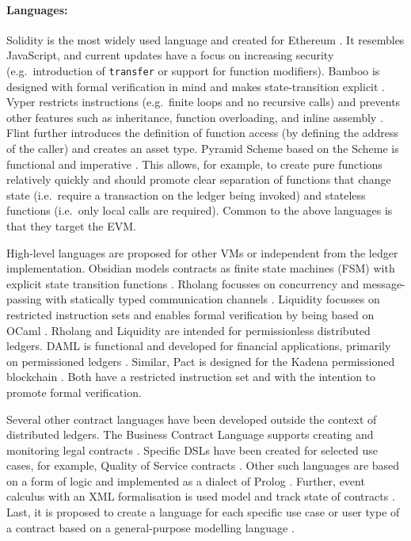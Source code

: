 \paragraph{Languages:}
Solidity is the most widely used language and created for Ethereum \cite{Ethereum2018Solidity}. It resembles JavaScript, and current updates have a focus on increasing security (e.g.\ introduction of \texttt{transfer} or support for function modifiers). 
Bamboo is designed with formal verification in mind and makes state-transition explicit \cite{Hirai2018Bamboo}. 
Vyper restricts instructions (e.g.\ finite loops and no recursive calls) and prevents other features such as inheritance, function overloading, and inline assembly \cite{Ethereum2018Vyper}. 
Flint further introduces the definition of function access (by defining the address of the caller) and creates an asset type. 
Pyramid Scheme based on the Scheme is functional and imperative \cite{Burge2018}. This allows, for example, to create pure functions relatively quickly and should promote clear separation of functions that change state (i.e.\ require a transaction on the ledger being invoked) and stateless functions (i.e.\ only local calls are required).
Common to the above languages is that they target the EVM.

High-level languages are proposed for other VMs or independent from the ledger implementation.
Obsidian models contracts as finite state machines (FSM) with explicit state transition functions \cite{Coblenz2017}.
Rholang focusses on concurrency and message-passing with statically typed communication channels \cite{Meredith2018}.
Liquidity focusses on restricted instruction sets and enables formal verification by being based on OCaml \cite{OCamlProSAS2018}.
Rholang and Liquidity are intended for permissionless distributed ledgers.
DAML is functional and developed for financial applications, primarily on permissioned ledgers \cite{Shaul2018,Meier2018,Lippmeier2018,Huschenbett2018,Bernauer2018,Maric2018,Bleikertz2018,Lochbihler2018,Pilav2018}.
Similar, Pact is designed for the Kadena permissioned blockchain \cite{Popejoy2017}.
Both have a restricted instruction set and with the intention to promote formal verification.

Several other contract languages have been developed outside the context of distributed ledgers. The Business Contract Language supports creating and monitoring legal contracts \cite{Neal.2003,Governatori2006}. Specific DSLs have been created for selected use cases, for example, Quality of Service contracts \cite{Braga2009}.
Other such languages are based on a form of logic and implemented as a dialect of Prolog \cite{Michael2010}.
Further, event calculus with an XML formalisation is used model and track state of contracts \cite{Farrell2004}.
Last, it is proposed to create a language for each specific use case or user type of a contract based on a general-purpose modelling language \cite{Burge2018DSL}.

